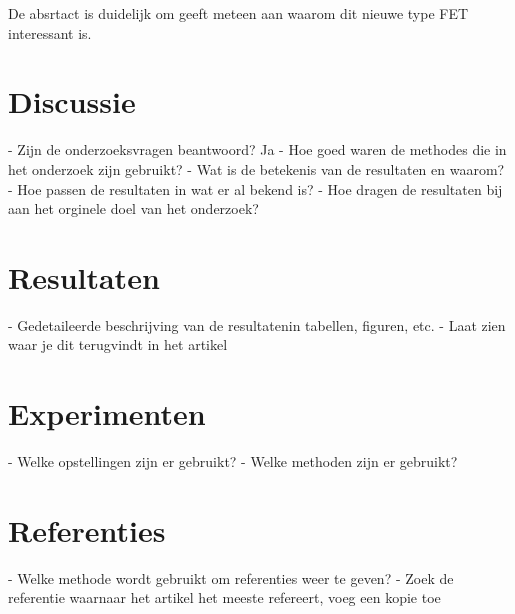 \documentclass[11pt]{report}
\begin{document}
De absrtact is duidelijk om geeft meteen aan waarom dit nieuwe type FET interessant is. 

\chapter{Discussie}
  - Zijn de onderzoeksvragen beantwoord? Ja
  - Hoe goed waren de methodes die in het onderzoek zijn gebruikt?
  - Wat is de betekenis van de resultaten en waarom?
  - Hoe passen de resultaten in wat er al bekend is?
  - Hoe dragen de resultaten bij aan het orginele doel van het onderzoek?

\chapter{Resultaten}
  - Gedetaileerde beschrijving van de resultatenin tabellen, figuren, etc.
  - Laat zien waar je dit terugvindt in het artikel

\chapter{Experimenten}
  - Welke opstellingen zijn er gebruikt?
  - Welke methoden zijn er gebruikt?

\chapter{Referenties}
  - Welke methode wordt gebruikt om referenties weer te geven?
  - Zoek de referentie waarnaar het artikel het meeste refereert, voeg een kopie toe




\appendix
\end{document}
